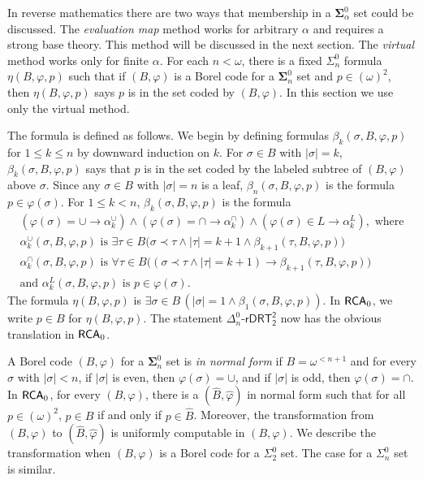 \documentclass{amsart}
\theoremstyle{definition}
\theoremstyle{remark}
\newcommand{\system}[1]{\mbox{\fontfamily{cmss}\fontshape{n}\fontseries{m}%
    \selectfont#1}}
\newcommand{\RCA}{\system{RCA}\ensuremath{_0}}
\begin{document}
In reverse mathematics there are two ways that membership in a $\mathbf \Sigma^0_\alpha$
set could be discussed.  The \emph{evaluation map} method works for 
arbitrary $\alpha$ and requires a strong base theory.  This method will 
be discussed in the next section.  The \emph{virtual}
method works only for finite $\alpha$.  For each $n<\omega$, there is a 
fixed $\Sigma^0_n$ formula $\eta(B,\varphi, p)$ such that if $(B,\varphi)$ is a Borel code for a $\mathbf \Sigma^0_n$ set and $p \in (\omega)^2$, then $\eta(B,\varphi,p)$ says $p$ is in the 
set coded by $(B,\varphi)$.  In this section we use only the virtual method.

The formula is defined as follows.  We begin by defining formulas $\beta_k(\sigma, B, \varphi, p)$ for $1 \leq k \leq n$ by downward induction on $k$. For $\sigma \in B$ with $|\sigma| = k$, 
$\beta_k(\sigma, B, \varphi, p)$ says that $p$ is in the set coded by the labeled subtree of $(B,\varphi)$ above $\sigma$. Since any $\sigma \in B$ 
with $|\sigma| = n$ is a leaf, $\beta_n(\sigma, B, \varphi, p)$ is the formula $p \in \varphi(\sigma)$. For $1 \leq k < n$, $\beta_k(\sigma, B, \varphi, p)$ is the formula  
\begin{gather*}
(\varphi(\sigma) = \cup \rightarrow \alpha_{k}^{\cup}) \wedge (\varphi(\sigma) = \cap \rightarrow \alpha_{k}^{\cap}) \wedge (\varphi(\sigma) \in L \rightarrow \alpha_{k}^L), \text{ where} \\
\alpha_{k}^{\cup}(\sigma,B, \varphi, p) \text{ is } \exists \tau \in B \big( \sigma \prec \tau \wedge |\tau|=k+1 \wedge \beta_{k+1}(\tau,B,\varphi,p) \big) \\
\alpha_{k}^{\cap}(\sigma, B, \varphi, p) \text{ is } \forall \tau \in B \big( (\sigma \prec \tau \wedge |\tau|=k+1) \rightarrow \beta_{k+1}(\tau,B,\varphi,p) \big) \\
\text{and }\alpha_{k}^L(\sigma, B, \varphi,p) \text{ is } p \in \varphi(\sigma).
\end{gather*}
The formula $\eta(B, \varphi, p)$ is $\exists \sigma \in B \, (|\sigma| = 1 \wedge \beta_1(\sigma, B, \varphi, p))$. In $\RCA$, we write $p \in B$ for $\eta(B,\varphi,p)$. The statement 
$\Delta^0_n$-$\mathsf{rDRT^2_2}$ now has the obvious translation in $\RCA$.

A Borel code $(B, \varphi)$ for a $\mathbf \Sigma^0_n$ set is \textit{in normal form} if $B = \omega^{< n+1}$ and for every $\sigma$ 
with $|\sigma| < n$, if $|\sigma|$ is even, then $\varphi(\sigma) = \cup$, and if $|\sigma|$ is odd, then $\varphi(\sigma) = \cap$. In $\RCA$, for every $(B,\varphi)$, there is a 
$(\widehat{B}, \widehat{\varphi})$ in normal form such that for all $p \in (\omega)^2$, $p \in B$ if and only if $p \in \widehat{B}$. Moreover, 
the transformation from $(B,\varphi)$ to $(\widehat{B}, \widehat{\varphi})$ is uniformly computable in $(B,\varphi)$. We describe the transformation when $(B,\varphi)$ is a Borel code for a 
$\Sigma^0_2$ set. The case for a $\Sigma^0_n$ set is similar. 
\end{document}
